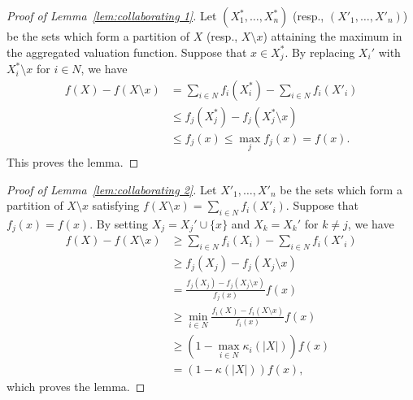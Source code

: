 \documentclass[letterpaper]{article}
\theoremstyle{definition}
\begin{document}
\begin{proof}[Proof of Lemma~\ref{lem:collaborating 1}]
Let $(X^*_1, \ldots, X^*_n)$ (resp., $(X'_1, \ldots, X'_n)$) be the sets which form a partition of $X$ (resp., $X \setminus x$) attaining the maximum in the aggregated valuation function. %
Suppose that $x \in X_j^*$.
By replacing $X_i'$ with $X^*_i \setminus x$ for $i\in N$, we have
\begin{align}
  f(X) - f(X \setminus x) 
  & = \sum_{i\in N} f_i(X^*_i) - \sum_{i\in N} f_i(X'_i) \nonumber\\
  &\le f_j(X^*_j) - f_j(X^*_j \setminus x) \nonumber \\
                          &\le f_j(x)  \le \max_j f_j(x)=f(x).
\end{align}
This proves the lemma.
\end{proof}

\begin{proof}[Proof of Lemma~\ref{lem:collaborating 2}]
Let $X'_1, \ldots, X'_n$ be the sets which form a partition of $X \setminus x$ 
satisfying $f(X \setminus x) = \sum_{i\in N} f_i(X'_i)$.
Suppose that \(f_j(x)= f(x)\).
By setting $X_j = X_j' \cup \{x\}$ and $X_k = X_k'$ for $k \neq j$, we have
\begin{align}
  f(X) - f(X \setminus x) 
  & \ge \sum_{i\in N} f_i(X_i) - \sum_{i\in N} f_i(X'_i) \nonumber\\ 
  &\ge f_j(X_j) - f_j(X_j\setminus x) \nonumber \\
  &= \frac{f_j(X_j) - f_j(X_j\setminus x)}{f_j(x)}f(x) \nonumber \\
  &\ge \min_{i\in N}\frac{f_i(X) - f_i(X\setminus x)}{f_i(x)}f(x) \nonumber \\
  &\ge (1-\max_{i\in N}\kappa_i(|X|))f(x) \nonumber \\
  &= (1-\kappa(|X|))f(x),
\end{align}
which proves the lemma.
\end{proof}
\end{document}
